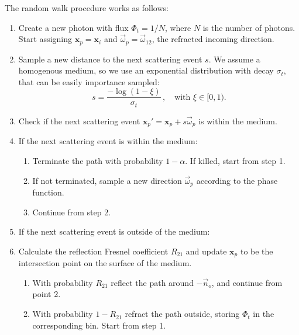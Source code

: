 \documentclass[10pt,a4paper]{article}
\newcommand{\x}{\mathbf{x}}
\newcommand{\vomega}{\vec{\omega}}
\begin{document}
The random walk procedure works as follows:
%
\begin{enumerate}

\item Create a new photon with flux $\Phi_t = 1 / N$, where $N$ is the number of photons. Start assigning $\x_p = \x_i$ and $\vomega_p = \vomega_{12}$, the refracted incoming direction.

\item Sample a new distance to the next scattering event $s$. We assume a homogenous medium, so we use an exponential distribution with decay $\sigma_t$, that can be easily importance sampled:
%
\[
s = \frac{-\log(1 -\xi)}{\sigma_t} \, , \quad \textrm{with $\xi \in [0,1)$.}
\]

\item Check if the next scattering event $\x_p' = \x_p + s \vomega_p $ is within the medium.

\item If the next scattering event is within the medium:

\begin{enumerate}

\item Terminate the path with probability $1-\alpha$. If killed, start from step 1.

\item If not terminated, sample a new direction $\vomega_p$ according to the phase function.

\item Continue from step 2.

\end{enumerate}

\item If the next scattering event is outside of the medium:

\item Calculate the reflection Fresnel coefficient $R_{21}$ and update $\x_p$ to be the intersection point on the surface of the medium.

\begin{enumerate}

\item With probability $R_{21}$ reflect the path around $-\vec{n}_o$, and continue from point 2.

\item With probability $1 - R_{21}$ refract the path outside, storing $\Phi_t$ in the corresponding bin. Start from step 1.

\end{enumerate}

\end{enumerate}
\end{document}
